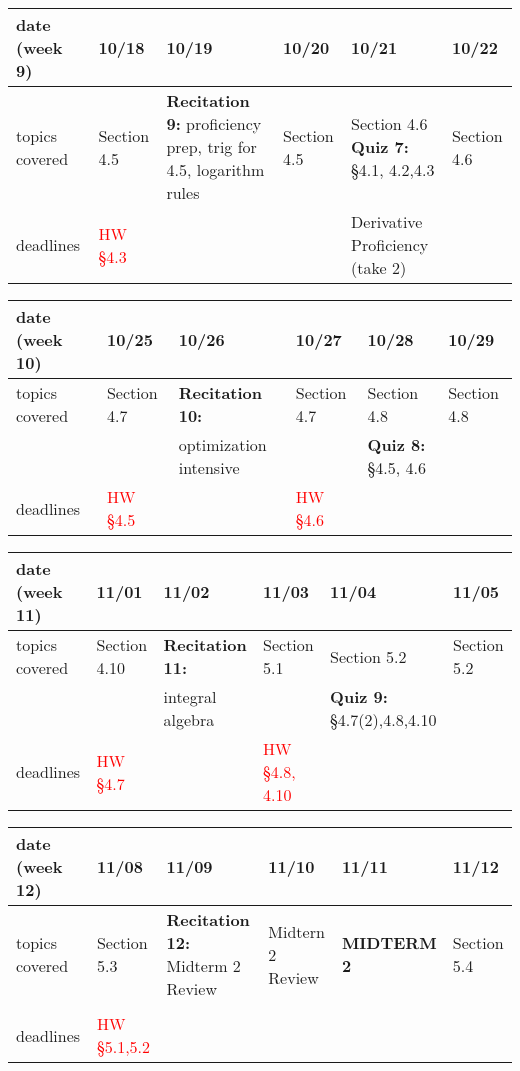 \documentclass[11pt,fleqn]{article}
\begin{document}
\vfill
\begin{tabularx}{\textwidth}{|X|| X | X | X | X | X |}
\hline
\rowcolor{gray!20}
date (week 9)&10/18&10/19&10/20&10/21&10/22\\ \hline
topics covered&Section 4.5&\textbf{Recitation 9:} proficiency prep, trig for 4.5, logarithm rules&Section 4.5&Section 4.6 \textbf{Quiz 7:} \S 4.1, 4.2,4.3&Section 4.6\\  \hline
deadlines&\textcolor{red}{HW \S 4.3}&&&\textcolor{dcyan}{Derivative Proficiency (take 2)}& \\  \hline
\end{tabularx}
\vfill
\begin{tabularx}{\textwidth}{|X|| X | X | X | X | X |}
\hline
\rowcolor{gray!20}
date (week 10)&10/25&10/26&10/27&10/28&10/29\\ \hline
topics covered&Section 4.7&\textbf{Recitation 10:}&Section 4.7&Section 4.8&Section 4.8\\ 
&&optimization intensive&&\textbf{Quiz 8:} \: \quad \S 4.5, 4.6&\\ \hline
deadlines&\textcolor{red}{HW \S 4.5}&&\textcolor{red}{HW \S 4.6}&& \\ \hline 
\end{tabularx}
\vfill
\begin{tabularx}{\textwidth}{|X|| X | X | X | X | X |}
\hline
\rowcolor{gray!20}
date (week 11)&11/01&11/02&11/03&11/04&11/05\\ \hline
topics covered&Section 4.10&\textbf{Recitation 11:}&Section 5.1&Section 5.2&Section 5.2\\ 
&&integral algebra&&\textbf{Quiz 9:} \S4.7(2),4.8,4.10&\\ \hline
deadlines&\textcolor{red}{HW \S 4.7}&&\textcolor{red}{HW \S 4.8, 4.10}&& \\ \hline 
\end{tabularx}
\vfill
\begin{tabularx}{\textwidth}{|X|| X | X | X | X | X |}
\hline
\rowcolor{gray!20}
date (week 12)&11/08&11/09&11/10&11/11&11/12\\ \hline
topics covered&Section 5.3&\textbf{Recitation 12:} Midterm 2 Review&Midtern 2 Review&\textcolor{dcyan}{\textbf{MIDTERM 2}}&Section 5.4\\ 
&&&&&\\ \hline
deadlines&\textcolor{red}{HW \S 5.1,5.2}&&&& \\ \hline
\end{tabularx}
\vfill
\newpage
\end{document}
